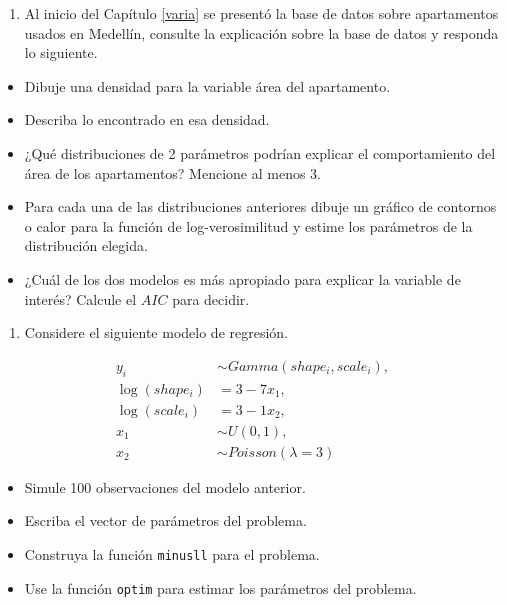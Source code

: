 \documentclass[10pt,]{krantz}
\providecommand{\tightlist}{%
  \setlength{\itemsep}{0pt}\setlength{\parskip}{0pt}}
\begin{document}
\begin{enumerate}
\def\labelenumi{\arabic{enumi})}
\setcounter{enumi}{2}
\tightlist
\item
  Al inicio del Capítulo \ref{varia} se presentó la base de datos sobre
  apartamentos usados en Medellín, consulte la explicación sobre la base
  de datos y responda lo siguiente.
\end{enumerate}

\begin{itemize}
\tightlist
\item
  Dibuje una densidad para la variable área del apartamento.
\item
  Describa lo encontrado en esa densidad.
\item
  ¿Qué distribuciones de 2 parámetros podrían explicar el comportamiento
  del área de los apartamentos? Mencione al menos 3.
\item
  Para cada una de las distribuciones anteriores dibuje un gráfico de
  contornos o calor para la función de log-verosimilitud y estime los
  parámetros de la distribución elegida.
\item
  ¿Cuál de los dos modelos es más apropiado para explicar la variable de
  interés? Calcule el \(AIC\) para decidir.
\end{itemize}

\begin{enumerate}
\def\labelenumi{\arabic{enumi})}
\setcounter{enumi}{3}
\tightlist
\item
  Considere el siguiente modelo de regresión.
\end{enumerate}

\begin{align*}
y_i &\sim Gamma(shape_i, scale_i), \\
\log(shape_i) &= 3 - 7 x_1, \\
\log(scale_i) &= 3 - 1 x_2, \\
x_1 &\sim U(0, 1), \\
x_2 &\sim Poisson(\lambda=3)
\end{align*}

\begin{itemize}
\tightlist
\item
  Simule 100 observaciones del modelo anterior.
\item
  Escriba el vector de parámetros del problema.
\item
  Construya la función \texttt{minusll} para el problema.
\item
  Use la función \texttt{optim} para estimar los parámetros del
  problema.
\end{itemize}
\end{document}
